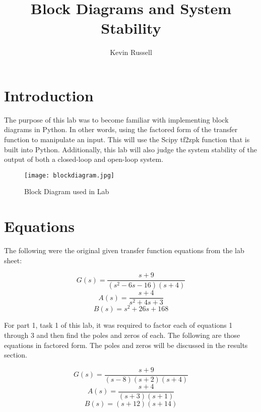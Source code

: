\documentclass[12pt, titlepage]{article}
\author{Kevin Russell}
\title{Block Diagrams and System Stability}
\date{\parbox{\linewidth}{\centering%
  \experimentDate
  \endgraf\bigskip
  \className\ -- Section \sectionNumber\
}}
\begin{document}
 \newpage
	    \maketitle
\newpage
    \tableofcontents
    
\newpage
    \section{Introduction}    
    The purpose of this lab was to become familiar with implementing block diagrams in Python.  In other words, using the factored form of the transfer function to manipulate an input.  This will use the Scipy tf2zpk function that is built into Python.  Additionally, this lab will also judge the system stability of the output of both a closed-loop and open-loop system.
    
    \begin{figure}[h!]
        \centering
        \texttt{[image: blockdiagram.jpg]}
        \caption{Block Diagram used in Lab}
        \label{fig:my_label}
    \end{figure}
    
    \section{Equations}
    The following were the original given transfer function equations from the lab sheet:
    
    \begin{equation}
        G(s) = \frac{s+9}{(s^2-6s-16)(s+4)}
    \end{equation}
    \begin{equation}
        A(s) = \frac{s+4}{s^2+4s+3}
    \end{equation}
    \begin{equation}
        B(s) = s^2+26s+168
    \end{equation}
    
    For part 1, task 1 of this lab, it was required to factor each of equations 1 through 3 and then find the poles and zeros of each.  The following are those equations in factored form.  The poles and zeros will be discussed in the results section.
    
    \begin{equation}
        G(s) = \frac{s+9}{(s-8)(s+2)(s+4)}
    \end{equation}
    \begin{equation}
        A(s) = \frac{s+4}{(s+3)(s+1)}
    \end{equation}
    \begin{equation}
        B(s) = (s+12)(s+14)
    \end{equation}
    
\end{document}
